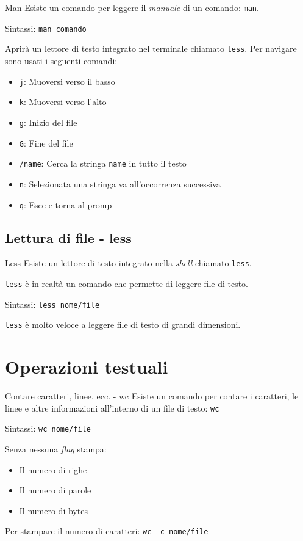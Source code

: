 \documentclass{beamer}
\begin{document}
\begin{frame}{Man}
  Esiste un comando per leggere il \textit{manuale} di un comando: 
  \texttt{man}.\bigskip

  Sintassi: \texttt{man comando}\bigskip

  Aprirà un lettore di testo integrato nel terminale chiamato \texttt{less}. Per 
  navigare sono usati i seguenti comandi:
  \begin{itemize}
    \item \texttt{j}: Muoversi verso il basso
    \item \texttt{k}: Muoversi verso l'alto
    \item \texttt{g}: Inizio del file
    \item \texttt{G}: Fine del file
    \item \texttt{/name}: Cerca la stringa \texttt{name} in tutto il testo
    \item \texttt{n}: Selezionata una stringa va all'occorrenza successiva
    \item \texttt{q}: Esce e torna al promp
  \end{itemize}
\end{frame}

\subsection{Lettura di file - less}
\begin{frame}{Less}
  Esiste un lettore di testo integrato nella \textit{shell} chiamato 
  \texttt{less}.\bigskip

  \texttt{less} è in realtà un comando che permette di leggere file di 
  testo.\bigskip

  Sintassi: \texttt{less nome/file}\bigskip

  \texttt{less} è molto veloce a leggere file di testo di grandi dimensioni.
\end{frame}

\section{Operazioni testuali}
\begin{frame}{Contare caratteri, linee, ecc. - wc}
  Esiste un comando per contare i caratteri, le linee e altre informazioni
  all'interno di un file di testo: \texttt{wc}\bigskip

  Sintassi: \texttt{wc nome/file}\bigskip

  Senza nessuna \textit{flag} stampa:
  \begin{itemize}
    \item Il numero di righe
    \item Il numero di parole
    \item Il numero di bytes
  \end{itemize}
  Per stampare il numero di caratteri: \texttt{wc -c nome/file}
\end{frame}
\end{document}
